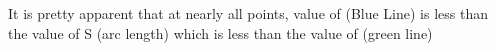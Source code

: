 \documentclass[preview]{standalone}
\begin{document}
\begin{center}
It is pretty apparent that at nearly all points, value of (Blue Line) is less than the value of S (arc length) which is less than the value of (green line)
\end{center}
\end{document}
